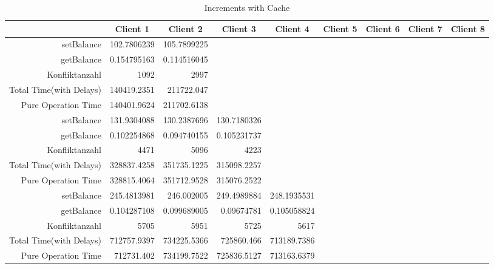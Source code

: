 \begin{landscape}
\begin{table}[htbp]
\scriptsize
  \centering
  \caption{Increments with Cache}
    \begin{tabular}{rrrrrrrrr}
    \toprule
          & \multicolumn{1}{c}{Client 1} & \multicolumn{1}{c}{Client 2} & \multicolumn{1}{c}{Client 3} & \multicolumn{1}{c}{Client 4} & \multicolumn{1}{c}{Client 5} & \multicolumn{1}{c}{Client 6} & \multicolumn{1}{c}{Client 7} & \multicolumn{1}{c}{Client 8} \\
    \midrule
    setBalance & 102.7806239 & 105.7899225 &       &       &       &       &       &  \\
    getBalance & 0.154795163 & 0.114516045 &       &       &       &       &       &  \\
    Konfliktanzahl & 1092  & 2997  &       &       &       &       &       &  \\
    Total Time(with Delays) & 140419.2351 & 211722.047 &       &       &       &       &       &  \\
    Pure Operation Time & 140401.9624 & 211702.6138 &       &       &       &       &       &  \\
\cline{1-9}      
    setBalance & 131.9304088 & 130.2387696 & 130.7180326 &       &       &       &       &  \\
    getBalance & 0.102254868 & 0.094740155 & 0.105231737 &       &       &       &       &  \\
    Konfliktanzahl & 4471  & 5096  & 4223  &       &       &       &       &  \\
    Total Time(with Delays) & 328837.4258 & 351735.1225 & 315098.2257 &       &       &       &       &  \\
    Pure Operation Time & 328815.4064 & 351712.9528 & 315076.2522 &       &       &       &       &  \\
\cline{1-9}      
    setBalance & 245.4813981 & 246.002005 & 249.4989884 & 248.1935531 &       &       &       &  \\
    getBalance & 0.104287108 & 0.099689005 & 0.09674781 & 0.105058824 &       &       &       &  \\
    Konfliktanzahl & 5705  & 5951  & 5725  & 5617  &       &       &       &  \\
    Total Time(with Delays) & 712757.9397 & 734225.5366 & 725860.466 & 713189.7386 &       &       &       &  \\
    Pure Operation Time & 712731.402 & 734199.7522 & 725836.5127 & 713163.6379 &       &       &       &  \\

\end{tabular}
\end{table}
\end{landscape}
